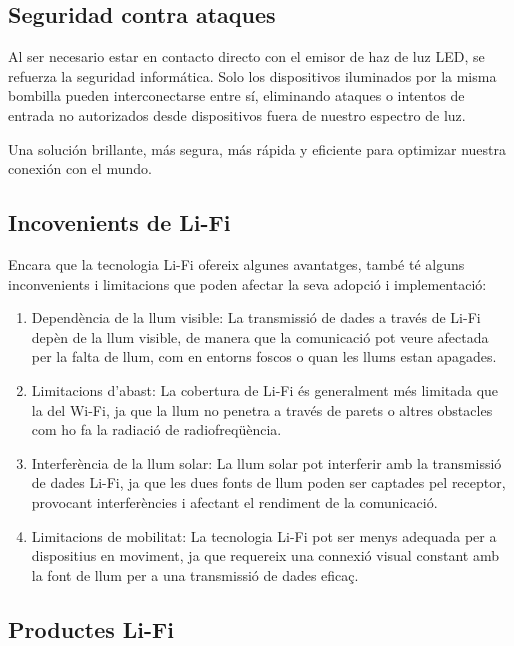 \subsection*{Seguridad contra ataques}


Al ser necesario estar en contacto directo con el emisor de haz de luz LED, se refuerza la seguridad informática. Solo los dispositivos iluminados por la misma bombilla pueden interconectarse entre sí, eliminando ataques o intentos de entrada no autorizados desde dispositivos fuera de nuestro espectro de luz.

Una solución brillante, más segura, más rápida y eficiente para optimizar nuestra conexión con el mundo.


\subsection*{Incovenients de Li-Fi}

Encara que la tecnologia Li-Fi ofereix algunes avantatges, també té alguns inconvenients i limitacions que poden afectar la seva adopció i implementació:

\begin{enumerate}
    \item Dependència de la llum visible: La transmissió de dades a través de Li-Fi depèn de la llum visible, de manera que la comunicació pot veure afectada per la falta de llum, com en entorns foscos o quan les llums estan apagades.
    \item Limitacions d'abast: La cobertura de Li-Fi és generalment més limitada que la del Wi-Fi, ja que la llum no penetra a través de parets o altres obstacles com ho fa la radiació de radiofreqüència.
    \item Interferència de la llum solar: La llum solar pot interferir amb la transmissió de dades Li-Fi, ja que les dues fonts de llum poden ser captades pel receptor, provocant interferències i afectant el rendiment de la comunicació.
    \item Limitacions de mobilitat: La tecnologia Li-Fi pot ser menys adequada per a dispositius en moviment, ja que requereix una connexió visual constant amb la font de llum per a una transmissió de dades eficaç.
\end{enumerate}



\subsection*{Productes Li-Fi}
